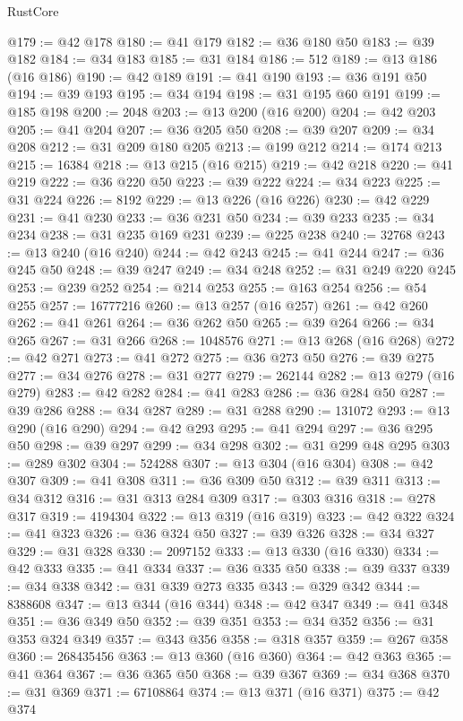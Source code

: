 \begin{lexlean}{RustCore}
\begin{coremodule}
@179 := @42 @178
@180 := @41 @179
@182 := @36 @180 @50
@183 := @39 @182
@184 := @34 @183
@185 := @31 @184
@186 := 512
@189 := @13 @186 (@16 @186)
@190 := @42 @189
@191 := @41 @190
@193 := @36 @191 @50
@194 := @39 @193
@195 := @34 @194
@198 := @31 @195 @60 @191
@199 := @185 @198
@200 := 2048
@203 := @13 @200 (@16 @200)
@204 := @42 @203
@205 := @41 @204
@207 := @36 @205 @50
@208 := @39 @207
@209 := @34 @208
@212 := @31 @209 @180 @205
@213 := @199 @212
@214 := @174 @213
@215 := 16384
@218 := @13 @215 (@16 @215)
@219 := @42 @218
@220 := @41 @219
@222 := @36 @220 @50
@223 := @39 @222
@224 := @34 @223
@225 := @31 @224
@226 := 8192
@229 := @13 @226 (@16 @226)
@230 := @42 @229
@231 := @41 @230
@233 := @36 @231 @50
@234 := @39 @233
@235 := @34 @234
@238 := @31 @235 @169 @231
@239 := @225 @238
@240 := 32768
@243 := @13 @240 (@16 @240)
@244 := @42 @243
@245 := @41 @244
@247 := @36 @245 @50
@248 := @39 @247
@249 := @34 @248
@252 := @31 @249 @220 @245
@253 := @239 @252
@254 := @214 @253
@255 := @163 @254
@256 := @54 @255
@257 := 16777216
@260 := @13 @257 (@16 @257)
@261 := @42 @260
@262 := @41 @261
@264 := @36 @262 @50
@265 := @39 @264
@266 := @34 @265
@267 := @31 @266
@268 := 1048576
@271 := @13 @268 (@16 @268)
@272 := @42 @271
@273 := @41 @272
@275 := @36 @273 @50
@276 := @39 @275
@277 := @34 @276
@278 := @31 @277
@279 := 262144
@282 := @13 @279 (@16 @279)
@283 := @42 @282
@284 := @41 @283
@286 := @36 @284 @50
@287 := @39 @286
@288 := @34 @287
@289 := @31 @288
@290 := 131072
@293 := @13 @290 (@16 @290)
@294 := @42 @293
@295 := @41 @294
@297 := @36 @295 @50
@298 := @39 @297
@299 := @34 @298
@302 := @31 @299 @48 @295
@303 := @289 @302
@304 := 524288
@307 := @13 @304 (@16 @304)
@308 := @42 @307
@309 := @41 @308
@311 := @36 @309 @50
@312 := @39 @311
@313 := @34 @312
@316 := @31 @313 @284 @309
@317 := @303 @316
@318 := @278 @317
@319 := 4194304
@322 := @13 @319 (@16 @319)
@323 := @42 @322
@324 := @41 @323
@326 := @36 @324 @50
@327 := @39 @326
@328 := @34 @327
@329 := @31 @328
@330 := 2097152
@333 := @13 @330 (@16 @330)
@334 := @42 @333
@335 := @41 @334
@337 := @36 @335 @50
@338 := @39 @337
@339 := @34 @338
@342 := @31 @339 @273 @335
@343 := @329 @342
@344 := 8388608
@347 := @13 @344 (@16 @344)
@348 := @42 @347
@349 := @41 @348
@351 := @36 @349 @50
@352 := @39 @351
@353 := @34 @352
@356 := @31 @353 @324 @349
@357 := @343 @356
@358 := @318 @357
@359 := @267 @358
@360 := 268435456
@363 := @13 @360 (@16 @360)
@364 := @42 @363
@365 := @41 @364
@367 := @36 @365 @50
@368 := @39 @367
@369 := @34 @368
@370 := @31 @369
@371 := 67108864
@374 := @13 @371 (@16 @371)
@375 := @42 @374

\end{coremodule}
\end{lexlean}

